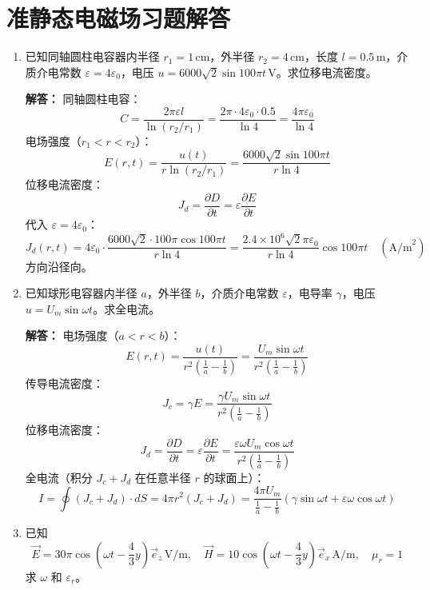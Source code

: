 \section{准静态电磁场习题解答}

\begin{enumerate}[label=\arabic*.]

\item 已知同轴圆柱电容器内半径 \(r_1=1\,\text{cm}\)，外半径 \(r_2=4\,\text{cm}\)，长度 \(l=0.5\,\text{m}\)，介质介电常数 \(\varepsilon=4\varepsilon_0\)，电压 \(u=6000\sqrt{2}\sin100\pi t\,\text{V}\)。求位移电流密度。

\textbf{解答：}
同轴圆柱电容：
\[
C = \frac{2\pi \varepsilon l}{\ln(r_2/r_1)} = \frac{2\pi \cdot 4\varepsilon_0 \cdot 0.5}{\ln 4} = \frac{4\pi \varepsilon_0}{\ln 4}
\]
电场强度（\(r_1<r<r_2\)）：
\[
E(r,t) = \frac{u(t)}{r\ln(r_2/r_1)} = \frac{6000\sqrt{2}\sin100\pi t}{r\ln 4}
\]
位移电流密度：
\[
J_d = \frac{\partial D}{\partial t} = \varepsilon \frac{\partial E}{\partial t}
\]
代入 \(\varepsilon=4\varepsilon_0\)：
\[
J_d(r,t) = 4\varepsilon_0 \cdot \frac{6000\sqrt{2}\cdot 100\pi \cos100\pi t}{r\ln 4}
= \frac{2.4\times 10^6 \sqrt{2}\pi \varepsilon_0}{r\ln 4} \cos100\pi t \quad (\text{A/m}^2)
\]
方向沿径向。

\vspace{1em}

\item 已知球形电容器内半径 \(a\)，外半径 \(b\)，介质介电常数 \(\varepsilon\)，电导率 \(\gamma\)，电压 \(u=U_m\sin\omega t\)。求全电流。

\textbf{解答：}
电场强度（\(a<r<b\)）：
\[
E(r,t) = \frac{u(t)}{r^2\left(\frac{1}{a}-\frac{1}{b}\right)} = \frac{U_m\sin\omega t}{r^2\left(\frac{1}{a}-\frac{1}{b}\right)}
\]
传导电流密度：
\[
J_c = \gamma E = \frac{\gamma U_m\sin\omega t}{r^2\left(\frac{1}{a}-\frac{1}{b}\right)}
\]
位移电流密度：
\[
J_d = \frac{\partial D}{\partial t} = \varepsilon \frac{\partial E}{\partial t} = \frac{\varepsilon \omega U_m\cos\omega t}{r^2\left(\frac{1}{a}-\frac{1}{b}\right)}
\]
全电流（积分 \(J_c+J_d\) 在任意半径 \(r\) 的球面上）：
\[
I = \oint (J_c+J_d)\cdot dS = 4\pi r^2 (J_c+J_d)
= \frac{4\pi U_m}{\frac{1}{a}-\frac{1}{b}} (\gamma \sin\omega t + \varepsilon \omega \cos\omega t)
\]

\vspace{1em}

\item 已知
\[
\vec{E} = 30\pi\cos\left(\omega t-\frac{4}{3}y\right)\vec{e}_z \,\text{V/m}, \quad
\vec{H} = 10\cos\left(\omega t-\frac{4}{3}y\right)\vec{e}_x \,\text{A/m}, \quad \mu_r=1
\]
求 \(\omega\) 和 \(\varepsilon_r\)。


\end{enumerate}
